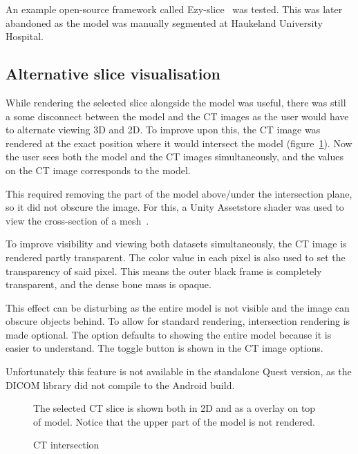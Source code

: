 \documentclass[a4paper]{report}
\begin{document}
An example open-source framework called Ezy-slice~\cite{arayan_davidarayanezy-slice_2022} was tested. This was later abandoned as the model was manually segmented at Haukeland University Hospital.

\subsection{Alternative slice visualisation}
While rendering the selected slice alongside the model was useful, there was still a some disconnect between the model and the CT images as the user would have to alternate viewing 3D and 2D.
To improve upon this, the CT image was rendered at the exact position where it would intersect the model (figure~\ref{intersection}). Now the user sees both the model and the CT images simultaneously, and the values on the CT image corresponds to the model.

This required removing the part of the model above/under the intersection plane, so it did not obscure the image. For this, a Unity Assetstore shader was used to view the cross-section of a mesh~\cite{aldandarawy_unity_2019}.

To improve visibility and viewing both datasets simultaneously, the CT image is rendered partly transparent. The color value in each pixel is also used to set the transparency of said pixel. This means the outer black frame is completely transparent, and the dense bone mass is opaque.

This effect can be disturbing as the entire model is not visible and the image can obscure objects behind. To allow for standard rendering, intersection rendering is made optional. The option defaults to showing the entire model because it is easier to understand.
The toggle button is shown in the CT image options.

Unfortunately this feature is not available in the standalone Quest version, as the DICOM library did not compile to the Android build.

\begin{figure}[h!]
    \centering
	\hfill
	\caption{CT intersection}\label{intersection}
  \small
  The selected CT slice is shown both in 2D and as a overlay on top of model. Notice that the upper part of the model is not rendered.
\end{figure}
\end{document}
